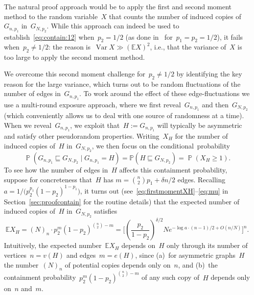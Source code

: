 \documentclass{article}
\renewcommand{\Pr}{\mathbb{P}}
\newcommand{\E}{\mathbb{E}}
\newcommand\lrpar[1]{\left(#1\right)}
\newcommand\Var{\operatorname{Var}}
\newcommand{\isub}{\sqsubseteq}
\DeclareMathOperator{\pr}{\mathbb{P}}
\newcommand\bigpar[1]{\bigl(#1\bigr)}
\newcommand\biggsqpar[1]{\biggl[#1\biggr]}
\begin{document}
The natural proof approach would be to apply the first and second moment method to the random variable~$X$ that counts the number of induced copies of~$G_{n,p_1}$ in~$G_{N,p_2}$. 
While this approach can indeed be used to establish~\eqref{eq:contain:12} when~${p_2=1/2}$ (as done in~\cite{chatterjee2021isomorphisms} for~$p_1=p_2=1/2$), 
it fails when~${p_2 \neq 1/2}$: the reason is~$\Var X \gg (\E X)^2$, i.e., that the variance of~$X$ is too large to apply the second moment method. 

We overcome this second moment challenge for~$p_2 \neq 1/2$ by identifying the key reason for the large variance, 
which turns out to be random fluctuations of the number of edges in~$G_{n,p_1}$.
To work around the effect of these edge-fluctuations we use a multi-round exposure approach, where we first reveal~$G_{n,p_1}$ and then~$G_{N,p_2}$ 
(which conveniently allows us to deal with one source of randomness at a time). 
When we reveal~$G_{n,p_1}$, we exploit that~$H:=G_{n,p_1}$ will typically be asymmetric and satisfy other pseudorandom properties. 
Writing~$X_H$ for the number of induced copies of~$H$ in~$G_{N,p_2}$, 
we then focus on the conditional~probability
\begin{equation}\label{eq:heur:ISI:Pr}
\pr(G_{n,p_1} \isub G_{N,p_2} \mid G_{n,p_1}=H) = \Pr(H\isub G_{N,p_2})=\pr(X_H \ge 1) .
\end{equation}
To see how the number of edges in~$H$ affects this containment probability, 
suppose for concreteness that~$H$ has $m=\binom{n}{2}p_1+\delta n/2$ edges. 
Recalling~$a = {1/\bigpar{p_2^{p_1}(1-p_2)^{1-p_1}}}$, 
it turns out (see~\eqref{eq:firstmomentXH}--\eqref{eq:mu} in Section~\ref{sec:proofcontain} for the routine details) that the expected number of induced copies of~$H$ in~$G_{N,p_2}$ satisfies 
\begin{equation}\label{eq:heur:ISI}
\E X_H= 
(N)_n \cdot  p_2^m(1-p_2)^{\binom{n}{2}-m}
= \biggsqpar{\lrpar{\frac{p_2}{1-p_2}}^{\delta/2} N e^{-\log a \cdot (n-1)/2 + O(n/N)} }^n.
\end{equation}
Intuitively, the expected number~${\E X_H}$ depends on~$H$ only through its number of vertices~${n=v(H)}$ and edges~${m=e(H)}$, 
since (a)~for asymmetric graphs~$H$ the number~${(N)_n}$ of potential copies depends only on~$n$, 
and (b)~the containment probability~${p_2^m(1-p_2)^{\binom{n}{2}-m}}$ of any such copy of~$H$ depends only on~$n$ and~$m$. 
\end{document}
